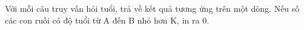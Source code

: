 Với mỗi câu truy vấn hỏi tuổi, trả về kết quả tương ứng trên một dòng. Nếu số các con ruồi có độ tuổi từ A đến B nhỏ hơn K, in ra 0.